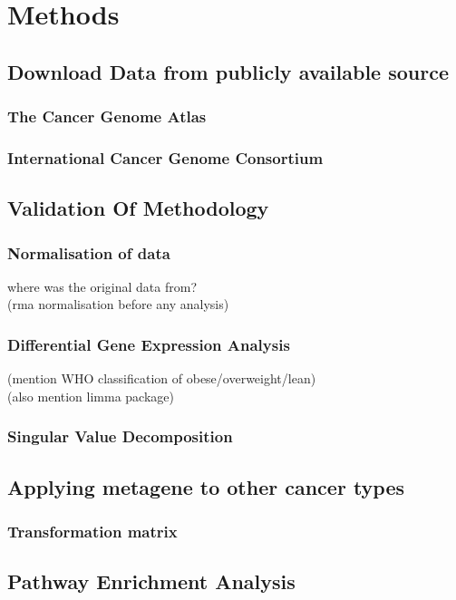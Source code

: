 \chapter{Methods}

\section{Download Data from publicly available source}


\subsection{The Cancer Genome Atlas}


\subsection{International Cancer Genome Consortium}



\section{Validation Of Methodology}

\subsection{Normalisation of \citet{Creighton2012} data}

where was the original data from?\\
(rma normalisation before any analysis)

\subsection{Differential Gene Expression Analysis}

(mention WHO classification of obese/overweight/lean)\\
(also mention limma package)

\subsection{Singular Value Decomposition}


\section{Applying metagene to other cancer types}

\subsection{Transformation matrix}


\section{Pathway Enrichment Analysis}








